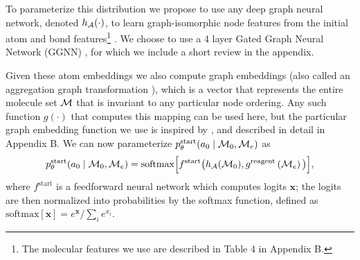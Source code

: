 To parameterize this distribution we propose to use any deep graph neural network, denoted $h_{{\mathcal{A}}}(\cdot)$, to learn graph-isomorphic node features from the initial atom and bond features\footnote{The molecular features we use are described in Table 4 in Appendix B.} \citep{duvenaud2015convolutional,kipf2016semi,li2016gated,gilmer2017neural}. We choose to use a 4 layer Gated Graph Neural Network (GGNN) \citep{li2016gated}, for which we include a short review in the appendix. %

Given these atom embeddings we also compute graph embeddings \citep[\S B.1]{li2018learning} (also called an aggregation graph transformation \citep[\S3]{Johnson2017-pd}), which is a vector that represents the entire molecule set ${\mathcal{M}}$ that is invariant to any particular node ordering. Any such function $g(\cdot)$ that computes this mapping can be used here, but the particular graph embedding function we use is inspired by \cite{li2018learning}, and described in detail in Appendix B. 
We can now parameterize $p_\theta^{\mathrm{start}}(a_0 \mid {\mathcal{M}}_0, {\mathcal{M}}_e)$ as
\begin{align}
p_\theta^{\mathrm{start}}(a_0 \mid  {\mathcal{M}}_0, {\mathcal{M}}_e) = \mbox{softmax}\Big[f^{\mathrm{start}}\big( h_{{\mathcal{A}}}({\mathcal{M}}_0), 
g^{\mathrm{reagent}}\left({\mathcal{M}}_e\right)\big)\Big], 
\end{align}
where $f^{\mathrm{start}}$ is a feedforward neural network which computes logits $\mathbf{x}$; the logits are then normalized into probabilities  by the softmax function, defined as $\mbox{softmax}[\mathbf{x}] = e^{\mathbf{x}}/\sum_{i} e^{x_i}$. %



